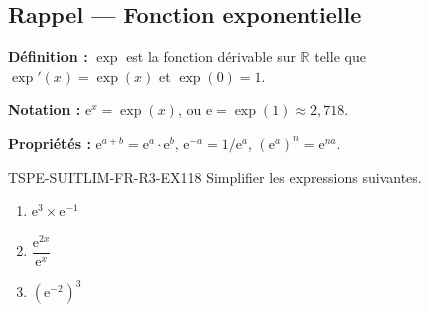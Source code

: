 

\subsection*{Rappel — Fonction exponentielle}

\textbf{Définition :} $\exp$ est la fonction dérivable sur $\mathbb{R}$ telle que $\exp'(x) = \exp(x)$ et $\exp(0) = 1$.

\textbf{Notation :} $\mathrm{e}^x = \exp(x)$, ou $\mathrm{e} = \exp(1) \approx 2{,}718$.

\textbf{Propriétés :} $\mathrm{e}^{a+b} = \mathrm{e}^a \cdot \mathrm{e}^b$, $\mathrm{e}^{-a} = 1/\mathrm{e}^a$, $(\mathrm{e}^a)^n = \mathrm{e}^{na}$.

\begin{exercice}{TSPE-SUITLIM-FR-R3-EX1}{1}{8}
Simplifier les expressions suivantes.
\begin{enumerate}
  \item $\mathrm{e}^3 \times \mathrm{e}^{-1}$
  \item $\dfrac{\mathrm{e}^{2x}}{\mathrm{e}^x}$
  \item $(\mathrm{e}^{-2})^3$
\end{enumerate}
\end{exercice}

